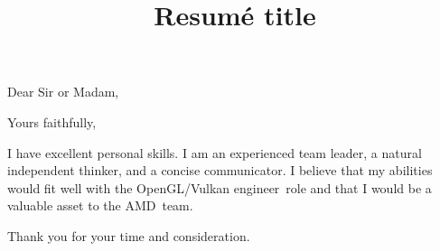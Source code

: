 \documentclass[11pt,a4paper,sans]{moderncv}        %
\title{Resumé title}                               %
\newcommand{\company}{AMD}
\newcommand{\role}{OpenGL/Vulkan engineer}
\begin{document}
\recipient{\company}{HR}
\opening{Dear Sir or Madam,}
\closing{Yours faithfully,}
\makelettertitle



%

%
%
%

I have excellent personal skills.
I am an experienced team leader, a natural independent thinker, and a concise communicator.
I believe that my abilities would fit well with the \role~role and that I would be a valuable asset to the \company~team.

Thank you for your time and consideration.
\end{document}
